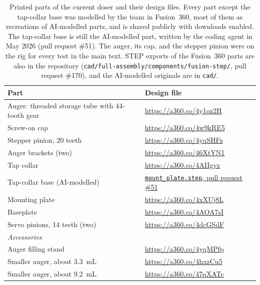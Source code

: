\documentclass[10pt]{article}
\begin{document}
\begin{table}[htbp]
\centering
\small
\caption{Printed parts of the current doser and their design files. Every part
except the tap-collar base was modelled by the team in Fusion~360, most of them
as recreations of AI-modelled parts, and is shared publicly with downloads
enabled. The tap-collar base is still the AI-modelled part, written by the
coding agent in May 2026 (pull request \#51). The auger, its cap, and the
stepper pinion were on the rig for every test in the main text. STEP exports of
the Fusion~360 parts are also in the repository
(\texttt{cad/full-assembly/components/fusion-step/}, pull request \#170), and
the AI-modelled originals are in \texttt{cad/}.}
\label{tbl:parts}
\begin{tabular}{p{7.4cm}l}
\toprule
Part & Design file \\
\midrule
Auger: threaded storage tube with 44-tooth gear & \url{https://a360.co/4y1oz2H} \\
Screw-on cap & \url{https://a360.co/4w9kRE5} \\
Stepper pinion, 20 teeth & \url{https://a360.co/4yqSHFz} \\
Auger brackets (two) & \url{https://a360.co/46XtYN1} \\
Tap collar & \url{https://a360.co/4AIIgyz} \\
Tap-collar base (AI-modelled) & \href{https://github.com/vertical-cloud-lab/powder-doser/blob/debe299/design/cad/tap-collar/mount_plate.step}{\texttt{mount\_plate.step}, pull request \#51} \\
Mounting plate & \url{https://a360.co/4xXUj8L} \\
Baseplate & \url{https://a360.co/4AOA7sI} \\
Servo pinions, 14 teeth (two) & \url{https://a360.co/4dcGSdF} \\
\midrule
\multicolumn{2}{l}{\emph{Accessories}}\\
Auger filling stand & \url{https://a360.co/4yqMPfp} \\
Smaller auger, about 3.3~mL & \url{https://a360.co/4hxzCu5} \\
Smaller auger, about 9.2~mL & \url{https://a360.co/47qXATc} \\
\bottomrule
\end{tabular}
\end{table}
\end{document}
